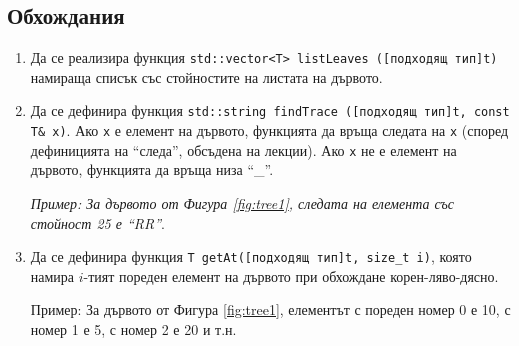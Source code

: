 \subsection {Обхождания}
\begin{enumerate}[resume]

  \item Да се реализира функция \texttt{std::vector<T> listLeaves ([подходящ тип]t)} намираща списък със стойностите на листата на дървото.

  \item Да се дефинира функция \texttt{std::string findTrace ([подходящ тип]t, const T\& x)}. Ако \texttt{x} е елемент на дървото, функцията да връща следата на \texttt{x} (според дефиницията на ``следа'', обсъдена на лекции). Ако \texttt{x} не е елемент на дървото, функцията да връща низа ``\_''.

  \textit{Пример: За дървото от Фигура \ref{fig:tree1}, следата на елемента със стойност 25 е ``RR''}.
    
  \item Да се дефинира функция \texttt{T getAt([подходящ тип]t, size\_t i)}, която намира $i$-тият пореден елемент на дървото при обхождане корен-ляво-дясно.
  
  Пример: За дървото от Фигура \ref{fig:tree1}, елементът с пореден номер 0 е 10, с номер 1 е 5, с номер 2 е 20 и т.н.
  
\end{enumerate}

